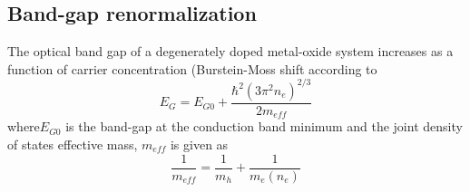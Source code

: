 \documentclass[final,5p,times]{elsarticle}
\begin{document}
\subsection{ Band-gap renormalization}
\label{sec:2.3}

The optical band gap of a degenerately doped metal-oxide system increases as a function of carrier concentration (Burstein-Moss shift \cite{Burstein1954,Moss1954} according to
\begin{equation}
\label{eqn:5}
E_G = E_{G0} + \frac{\hbar^2(3\pi^2n_e)^{2/3}}{2m_{eff}}
\end{equation}
where$E_{G0}$ is the band-gap at the conduction band minimum and the joint density of states effective mass, $m_{eff}$ is given as
\begin{equation}
\label{eqn:6}
\frac{1}{m_{eff}} = \frac{1}{m_h}+\frac{1}{m_e(n_e)}
\end{equation}
\end{document}
